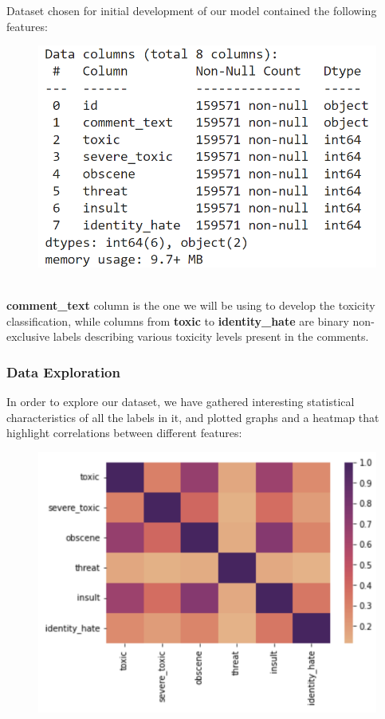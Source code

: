 \documentclass[]{article}
\begin{document}
	Dataset chosen for initial development of our model contained the following features:
	\begin{figure}[h]
		\includegraphics{screenshot1.png}
	\end{figure}\\
	\textbf{comment\_text} column is the one we will be using to develop the toxicity classification, while columns from \textbf{toxic} to \textbf{identity\_hate} are binary non-exclusive labels describing various toxicity levels present in the comments.
	
	\subsubsection{Data Exploration}
	
	In order to explore our dataset, we have gathered interesting statistical characteristics of all the labels in it, and plotted graphs and a heatmap that highlight correlations between different features:
	\begin{figure}[h]
		\includegraphics{screenshot2.png}
	\end{figure}\\
	
\end{document}

